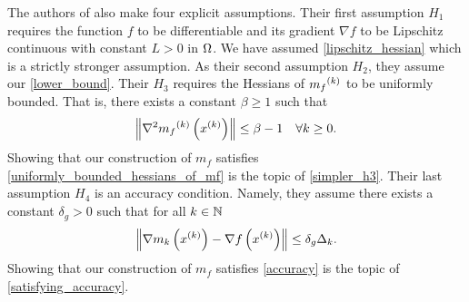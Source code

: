 The authors of \cite{Conejo:2013:GCT:2620806.2621814} also make four explicit assumptions.
Their first assumption $H_1$ requires the function $f$ to be differentiable and its gradient $\nabla f$ to be Lipschitz continuous with constant $L > 0$ in $\Omega$.
We have assumed \cref{lipschitz_hessian} which is a strictly stronger assumption.
As their second assumption $H_2$, they assume our \cref{lower_bound}.
Their $H_3$ requires the Hessians of ${{m}_f}^{(k)}$ to be uniformly bounded.
That is, there exists a constant $\beta \ge 1$ such that
\begin{align}
\label{uniformly_bounded_hessians_of_mf}
\left\|\nabla^2 {{m}_f}^{(k)}\left(x^{(k)}\right)\right\| \le \beta - 1\quad \forall k \ge 0.
\end{align}
Showing that our construction of $m_f$ satisfies \cref{uniformly_bounded_hessians_of_mf} is the topic of \cref{simpler_h3}.
Their last assumption $H_4$ is an accuracy condition.
Namely, they assume there exists a constant $\delta_g>0$ such that for all $k \in \mathbb N$
\begin{align}
\label{accuracy}
\left\|\nabla m_k\left(x^{(k)}\right) - \nabla f\left(x^{(k)}\right)\right\| \le \delta_g \Delta_k.
\end{align}
Showing that our construction of $m_f$ satisfies \cref{accuracy} is the topic of \cref{satisfying_accuracy}.


%

%
% 
% 

